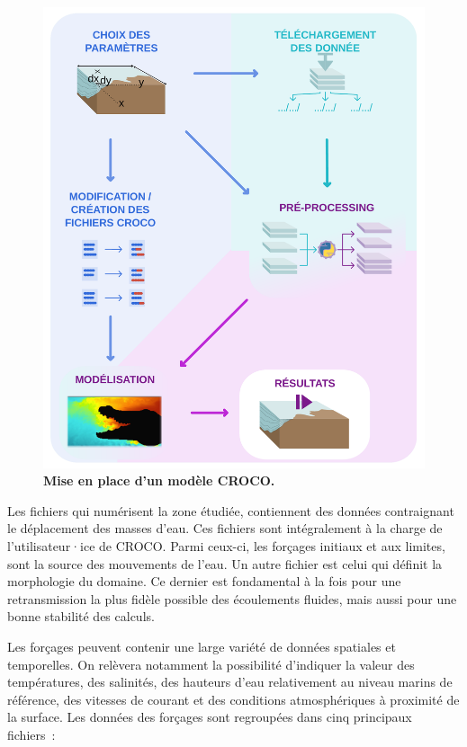 \documentclass[10pt,a4paper,titlepage]{article}
\begin{document}
\begin{figure}[h!]
    \centering
    \includegraphics[scale=0.35]{../images/workflow/mise_en_place_generale_croco.pdf}
    \caption{\textbf{Mise en place d'un modèle CROCO.}}
    \label{fig:workflow_simple}
\end{figure}

Les fichiers qui numérisent la zone étudiée, contiennent des données contraignant le déplacement des masses d'eau.
Ces fichiers sont intégralement à la charge de l'utilisateur·ice de CROCO.
Parmi ceux-ci, les forçages initiaux et aux limites, sont la source des mouvements de l'eau. Un autre fichier est celui qui définit la morphologie du domaine. Ce dernier est fondamental à la fois pour une retransmission la plus fidèle possible des écoulements fluides, mais aussi pour une bonne stabilité des calculs.

Les forçages peuvent contenir une large variété de données spatiales et temporelles.
On relèvera notamment la possibilité d'indiquer la valeur des températures, des salinités, des hauteurs d'eau relativement au niveau marins de référence, des vitesses de courant et des conditions atmosphériques à proximité de la surface.
Les données des forçages sont regroupées dans cinq principaux fichiers~:
\end{document}
